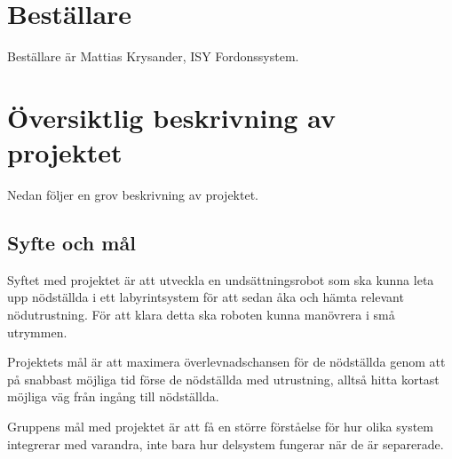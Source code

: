 \documentclass[11pt]{article}
\begin{document}
\begin{flushleft}
\section{Beställare}
Beställare är Mattias Krysander, ISY Fordonssystem.

\section{Översiktlig beskrivning av projektet}
Nedan följer en grov beskrivning av projektet.
\subsection{Syfte och mål}
Syftet med projektet är att utveckla en undsättningsrobot som ska kunna leta upp nödställda i ett labyrintsystem för att sedan åka och hämta relevant nödutrustning. För att klara detta ska roboten kunna manövrera i små utrymmen. 

Projektets mål är att maximera överlevnadschansen för de nödställda genom att på snabbast möjliga tid förse de nödställda med utrustning, alltså hitta kortast möjliga väg från ingång till nödställda.

Gruppens mål med projektet är att få en större förståelse för hur olika system integrerar med varandra, inte bara hur delsystem fungerar när de är separerade.



\end{flushleft}
\end{document}
